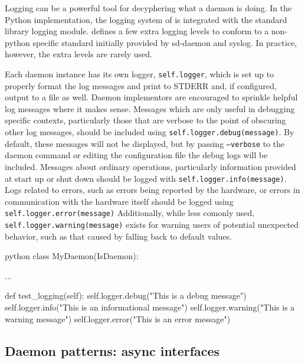 Logging can be a powerful tool for decyphering what a daemon is doing.
In the Python implementation, the logging system of \yaq{} is integrated with the standard library logging module\cite{pylogging}.
\yaq{} defines a few extra logging levels to conform to a non-python specific standard initially provided by sd-daemon\cite{sddaemon} and syslog\cite{Gerhards_2009}.
In practice, however, the extra levels are rarely used.

Each daemon instance has its own logger, \texttt{self.logger}, which is set up to properly format the log messages and print to STDERR and, if configured, output to a file as well.
Daemon implementors are encouraged to sprinkle helpful log messages where it makes sense.
Messages which are only useful in debugging specific contexts, particularly those that are verbose to the point of obscuring other log messages, should be included using \texttt{self.logger.debug(message)}.
By default, these messages will not be displayed, but by passing \texttt{--verbose} to the daemon command or editing the configuration file the debug logs will be included.
Messages about ordinary operations, particularly information provided at start up or shut down should be logged with \texttt{self.logger.info(message)}.
Logs related to errors, such as errors being reported by the hardware, or errors in communication with the hardware itself should be logged using \texttt{self.logger.error(message)}
Additionally, while less comonly used, \texttt{self.logger.warning(message)} exists for warning users of potential unexpected behavior, such as that caused by falling back to default values.

\begin{codefragment}{python}
class MyDaemon(IsDaemon):

    ...

    def test_logging(self):
        self.logger.debug("This is a debug message")
        self.logger.info("This is an informational message")
        self.logger.warning("This is a warning message")
        self.logger.error("This is an error message")
\end{codefragment}



\subsection{Daemon patterns: async interfaces}


